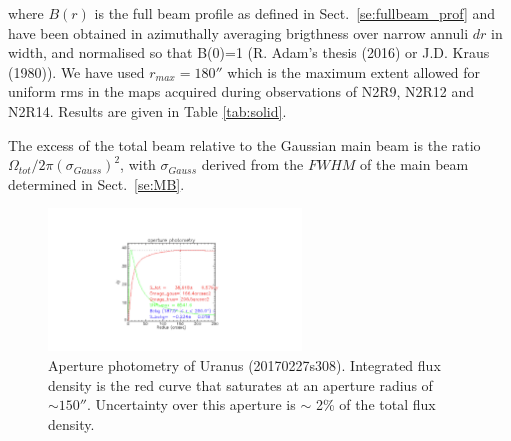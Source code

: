 \noindent where $B(r)$ is the full beam profile as defined in
Sect.~\ref{se:fullbeam_prof} and have been obtained in azimuthally averaging brigthness over narrow annuli
$dr$ in width, and normalised so that B(0)=1 (R. Adam's thesis (2016) or J.D. Kraus (1980)).
We have used $r_{max}=180''$ which is the maximum extent allowed for
uniform rms in the maps acquired during observations of N2R9, N2R12
and N2R14. Results are given in Table \ref{tab:solid}.

The excess of the total beam relative to the Gaussian main beam is the ratio
$\Omega_{tot} / 2 \pi (\sigma_{Gauss})^2$, with $\sigma_{Gauss}$
derived from the $FWHM$ of the main beam determined in Sect.~\ref{se:MB}.


\begin{figure}[ht!]
  \begin{center}
    \includegraphics[clip=true,width=0.6\textwidth, trim={8cm, 3cm, 8cm, 4cm}]{Figures/Aperture_photo/Uranus_s308_A1.pdf}
    \caption[Aperture photometry of Uranus]{Aperture photometry of Uranus (20170227s308). Integrated flux density is the red curve that
saturates at an aperture radius of $ \sim 150''$. Uncertainty over this aperture is $\sim$ 2\% of the total flux density.}
    \label{fig:Uranus_s308}
  \end{center}
\end{figure}

